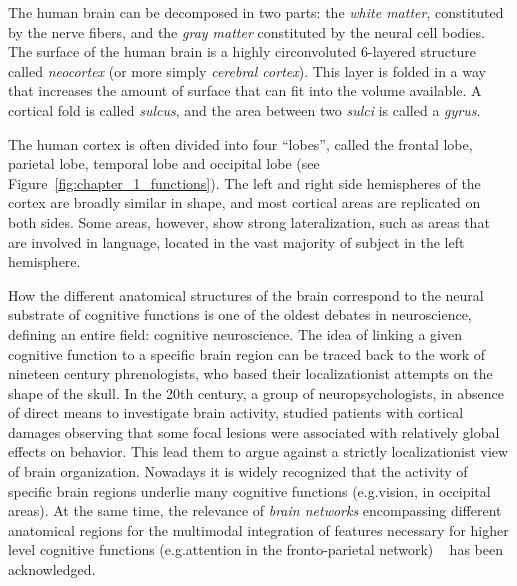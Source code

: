 The human brain can be decomposed in two parts: the \emph{white matter}, constituted by the nerve
fibers, and the \emph{gray matter} constituted by the neural cell bodies.
The surface of the human brain is a highly circonvoluted 6-layered structure
called \emph{neocortex} (or more simply \emph{cerebral cortex}). This layer is folded in a way that increases the amount of surface that can fit into the volume available. A cortical fold is called \emph{sulcus}, and the area between two \emph{sulci} is called a \emph{gyrus}.


The human cortex is often divided into four ``lobes'', called the frontal lobe, parietal lobe, temporal lobe and occipital lobe (see Figure~\ref{fig:chapter_1_functions}). The left and right side hemispheres of the cortex are broadly similar in shape, and most cortical areas are replicated on both sides. Some areas, however, show strong lateralization, such as areas that are involved in language, located in the vast majority of subject in the left hemisphere.


How the different anatomical structures of the brain correspond to the neural substrate of cognitive functions is one of the oldest debates in neuroscience, defining an entire field: cognitive neuroscience. The idea of linking a given cognitive function to a specific brain region can be traced back to the work of nineteen century phrenologists, who based their localizationist attempts on the shape of the skull. In the 20th century, a group of neuropsychologists, in absence of direct means to investigate brain activity, studied patients with cortical damages observing that some focal lesions were associated with relatively global effects on behavior. This lead them to argue against a strictly localizationist view of brain organization. Nowadays it is widely recognized that the activity of specific brain regions underlie many cognitive functions (e.g.vision, in occipital areas). At the same time, the relevance of \emph{brain networks} encompassing different anatomical regions for the multimodal integration of features necessary for higher level cognitive functions (e.g.attention in the fronto-parietal network) ~\citep{gazzaniga2004cognitive} has been acknowledged.


